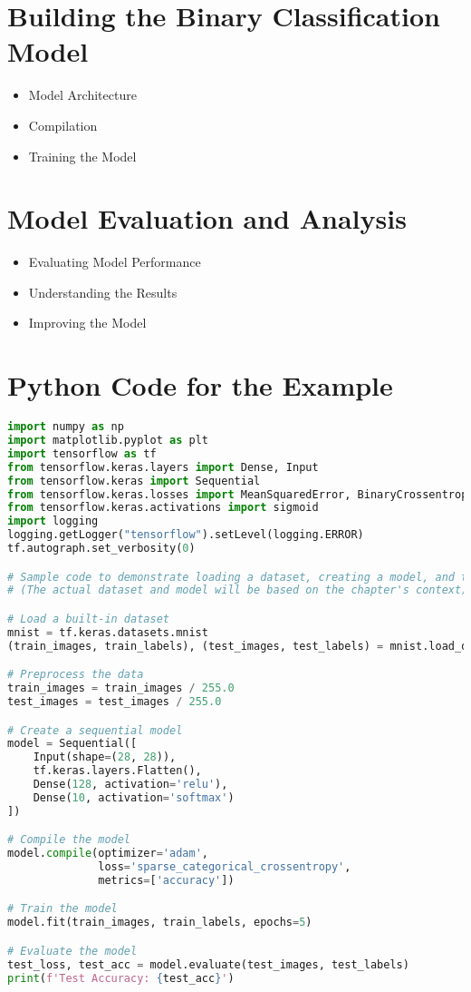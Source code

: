 \documentclass[a4paper,12pt]{book}
\begin{document}
\section{Building the Binary Classification Model}
\begin{itemize}
    \item Model Architecture
    \item Compilation
    \item Training the Model
\end{itemize}

\section{Model Evaluation and Analysis}
\begin{itemize}
    \item Evaluating Model Performance
    \item Understanding the Results
    \item Improving the Model
\end{itemize}

\section{Python Code for the Example}
\begin{lstlisting}[language=Python]
import numpy as np
import matplotlib.pyplot as plt
import tensorflow as tf
from tensorflow.keras.layers import Dense, Input
from tensorflow.keras import Sequential
from tensorflow.keras.losses import MeanSquaredError, BinaryCrossentropy
from tensorflow.keras.activations import sigmoid
import logging
logging.getLogger("tensorflow").setLevel(logging.ERROR)
tf.autograph.set_verbosity(0)

# Sample code to demonstrate loading a dataset, creating a model, and training
# (The actual dataset and model will be based on the chapter's context)

# Load a built-in dataset
mnist = tf.keras.datasets.mnist
(train_images, train_labels), (test_images, test_labels) = mnist.load_data()

# Preprocess the data
train_images = train_images / 255.0
test_images = test_images / 255.0

# Create a sequential model
model = Sequential([
    Input(shape=(28, 28)),
    tf.keras.layers.Flatten(),
    Dense(128, activation='relu'),
    Dense(10, activation='softmax')
])

# Compile the model
model.compile(optimizer='adam',
              loss='sparse_categorical_crossentropy',
              metrics=['accuracy'])

# Train the model
model.fit(train_images, train_labels, epochs=5)

# Evaluate the model
test_loss, test_acc = model.evaluate(test_images, test_labels)
print(f'Test Accuracy: {test_acc}')
\end{lstlisting}
\end{document}

